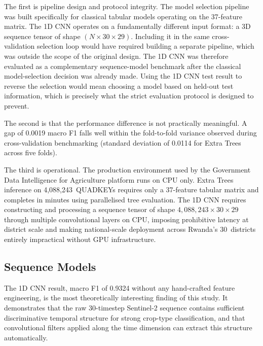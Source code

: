 The first is pipeline design and protocol integrity. The model
selection pipeline was built
specifically for classical tabular models operating on the
37-feature matrix. The 1D CNN operates on a fundamentally different
input format: a 3D sequence tensor of shape
$(N \times 30 \times 29)$. Including it in the same
cross-validation selection loop would have required building a
separate pipeline, which was outside the scope of the original
design. The 1D CNN was therefore evaluated as a complementary
sequence-model benchmark after the classical model-selection
decision was already made. Using the 1D CNN test result to reverse
the selection would mean choosing a model based on held-out test
information, which is precisely what the strict evaluation protocol
is designed to prevent.

The second is that the performance difference is not practically
meaningful. A gap of 0.0019 macro F1 falls well within the
fold-to-fold variance observed during cross-validation benchmarking
(standard deviation of 0.0114 for Extra Trees across five folds).

The third is operational. The production environment used by the
Government Data Intelligence for Agriculture platform runs on CPU
only. Extra Trees inference
on 4,088,243~QUADKEYs requires only a 37-feature tabular matrix
and completes in minutes using parallelised tree evaluation. The
1D CNN requires constructing and processing a sequence tensor of
shape $4{,}088{,}243 \times 30 \times 29$ through multiple
convolutional layers on CPU, imposing prohibitive latency at
district scale and making national-scale deployment across Rwanda's
30~districts entirely impractical without GPU infrastructure.


\subsection{Sequence Models}
\label{subsec:disc_sequence}

The 1D CNN result, macro F1 of 0.9324 without any hand-crafted
feature engineering, is the most theoretically interesting
finding of this study. It demonstrates that the raw 30-timestep
Sentinel-2 sequence contains sufficient discriminative temporal
structure for strong crop-type classification, and that
convolutional filters applied along the time dimension can extract
this structure automatically.

